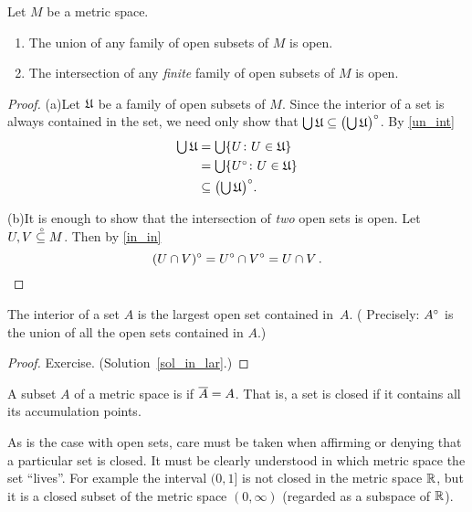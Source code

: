 \begin{prop}\label{op_in_ms} Let $M$ be a metric space.
 \begin{enumerate}
  \item[(a)] The union of any family of open subsets of $M$ is open.
  \item[(b)] The intersection of any \emph{finite} family of open subsets of $M$ is open.
 \end{enumerate}
\end{prop}

\begin{proof}
(a)\quad Let $\mathfrak{U}$ be a family of open subsets of $M$.  Since the interior of a set
is always contained in the set, we need only show that $\bigcup \mathfrak{U} \subseteq
\bigl(\bigcup \mathfrak{U}\bigr)^{\circ}$. By \ref{un_int}
 \begin{align*}
   \textstyle\bigcup \mathfrak{U}
              &= \textstyle\bigcup\{U\colon U \in \mathfrak{U}\} \\
              &= \textstyle\bigcup\{U^{\circ}\colon U \in \mathfrak{U}\} \\
              &\subseteq \bigl(\textstyle\bigcup \mathfrak{U}\bigr)^{\circ}.
 \end{align*}

(b)\quad It is enough to show that the intersection of \emph{two} open sets is open.  Let
$U,V\overset{\thickspace{}_\circ}{\subseteq}M$. Then by \ref{in_in}
  \[ (U \cap V)^{\circ} = U^{\circ} \cap V^{\circ} = U \cap V\,. \]
\end{proof}

\begin{prop}\label{in_lar} The interior of a set $A$ is the largest open set contained in~$A$.
\textup{( Precisely:} $A^{\circ}$ is the union of all the open sets contained in $A$.\textup{)}
\end{prop}

\begin{proof} Exercise.  (Solution~\ref{sol_in_lar}.)
  \ns \end{proof}

\begin{defn} A subset $A$ of a metric space is
 if $\overline{A} = A$. That is, a set is closed if it contains all its accumulation
points.
\end{defn}

\begin{exam} As is the case with open sets, care must be taken when affirming or denying that
a particular set is closed. It must be clearly understood in which metric space the set
``lives''. For example the interval $(0,1]$ is not closed in the metric space $\mathbb{R}$, but it is
a closed subset of the metric space $(0,\infty)$ (regarded as a subspace of $\mathbb{R}$).
\end{exam}


